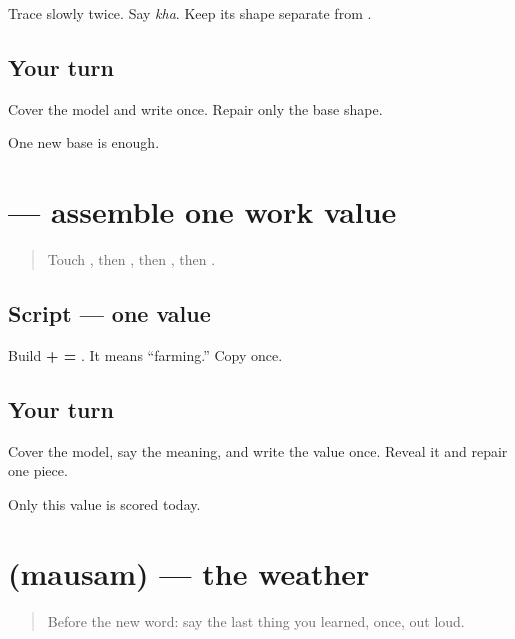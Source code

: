 Trace \textbf{} slowly twice. Say \emph{kha}. Keep its shape separate from \textbf{}.

\subsection*{Your turn}
Cover the model and write \textbf{} once. Repair only the base shape.

\begin{tcolorbox}[breakable,colback=teal!4,colframe=teal!35!black,title={Before you move on}]
One new base is enough.
\end{tcolorbox}
\section[\texorpdfstring{\pa{ਖੇਤੀ} (khetī)}{ਖੇਤੀ (khetī)}]{ — assemble one work value}

\label{lesson:PA-W05-farming}



\begin{quote}
Touch \textbf{}, then \textbf{}, then \textbf{}, then \textbf{}.
\end{quote}

\subsection*{Script — one value}
Build \textbf{ +  = }. It means “farming.” Copy \textbf{} once.

\subsection*{Your turn}
Cover the model, say the meaning, and write the value once. Reveal it and repair one piece.

\begin{tcolorbox}[breakable,colback=teal!4,colframe=teal!35!black,title={Before you move on}]
Only this value is scored today.
\end{tcolorbox}
\section[\texorpdfstring{\pa{ਮੌਸਮ} (mausam)}{ਮੌਸਮ (mausam)}]{ (mausam) — the weather}

\label{lesson:PA-C20-mausam}



\begin{quote}
Before the new word: say the last thing you learned, once, out loud.
\end{quote}

